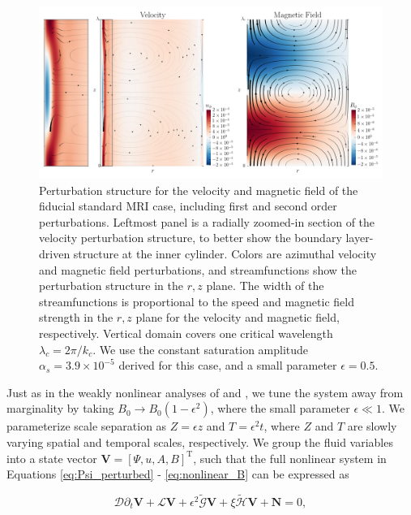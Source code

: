 \documentclass{emulateapj}
\newcommand{\beq}{\begin{equation}}
\newcommand{\eeq}{\end{equation}}
\newcommand{\citei}[1]{\citeauthor{#1} \citeyear{#1}}
\begin{document}
\begin{figure}
\centering
\includegraphics[width=\textwidth]{../figures/widegap_vel_Bfield_streamfuncs_512_final_wider.png}
\caption{Perturbation structure for the velocity and magnetic field of the fiducial standard MRI case, including first and second order perturbations. Leftmost panel is a radially zoomed-in section of the velocity perturbation structure, to better show the boundary layer-driven structure at the inner cylinder. Colors are azimuthal velocity and magnetic field perturbations, and streamfunctions show the perturbation structure in the $r, z$ plane. The width of the streamfunctions is proportional to the speed and magnetic field strength in the $r, z$ plane for the velocity and magnetic field, respectively. Vertical domain covers one critical wavelength $\lambda_c = 2\pi / k_c$. We use the constant saturation amplitude $\alpha_{s} = 3.9 \times 10^{-5}$ derived for this case, and a small parameter $\epsilon = 0.5$.}\label{fig:smri_streamfuncs}
\end{figure}

Just as in the weakly nonlinear analyses of \citei{Umurhan:2007hs} and \citei{Clark:2016}, we tune the system away from marginality by taking $B_0 \rightarrow B_0\left(1 - \epsilon^2\right)$, where the small parameter $\epsilon \ll 1$. We parameterize scale separation as $Z = \epsilon z$ and $T = \epsilon^2 t$, where $Z$ and $T$ are slowly varying spatial and temporal scales, respectively. We group the fluid variables into a state vector $\mathbf{V} = \left[\Psi, u, A, B\right]^{\mathrm{T}}$, such that the full nonlinear system in Equations \ref{eq:Psi_perturbed} - \ref{eq:nonlinear_B} can be expressed as

\beq\label{eq:unperturbed_matrix_eqns}
\mathcal{D}\partial_t\mathbf{V} + \mathcal{L}\mathbf{V} + \epsilon^2 \widetilde{\mathcal{G}} \mathbf{V} + \xi \widetilde{\mathcal{H}} \mathbf{V} +  \mathbf{N} = 0,
\eeq
\end{document}
